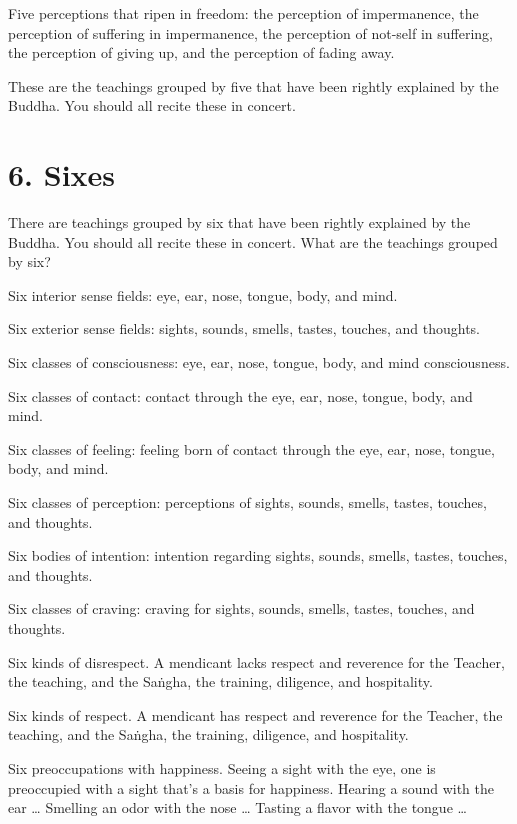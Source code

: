 \documentclass[12pt,openany]{book}%
\begin{document}
Five perceptions that ripen in freedom: the perception of impermanence, the perception of suffering in impermanence, the perception of not-self in suffering, the perception of giving up, and the perception of fading away. 

These are the teachings grouped by five that have been rightly explained by the Buddha. You should all recite these in concert. 

\section*{6. Sixes }

There are teachings grouped by six that have been rightly explained by the Buddha. You should all recite these in concert. What are the teachings grouped by six? 

Six interior sense fields: eye, ear, nose, tongue, body, and mind. 

Six exterior sense fields: sights, sounds, smells, tastes, touches, and thoughts. 

Six classes of consciousness: eye, ear, nose, tongue, body, and mind consciousness. 

Six classes of contact: contact through the eye, ear, nose, tongue, body, and mind. 

Six classes of feeling: feeling born of contact through the eye, ear, nose, tongue, body, and mind. 

Six classes of perception: perceptions of sights, sounds, smells, tastes, touches, and thoughts. 

Six bodies of intention: intention regarding sights, sounds, smells, tastes, touches, and thoughts. 

Six classes of craving: craving for sights, sounds, smells, tastes, touches, and thoughts. 

Six kinds of disrespect. A mendicant lacks respect and reverence for the Teacher, the teaching, and the \textsanskrit{Saṅgha}, the training, diligence, and hospitality. 

Six kinds of respect. A mendicant has respect and reverence for the Teacher, the teaching, and the \textsanskrit{Saṅgha}, the training, diligence, and hospitality. 

Six preoccupations with happiness. Seeing a sight with the eye, one is preoccupied with a sight that’s a basis for happiness. Hearing a sound with the ear … Smelling an odor with the nose … Tasting a flavor with the tongue … 
\end{document}
